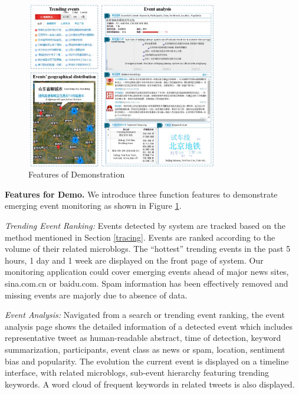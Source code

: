 \makeatletter
\setlength{\@fptop}{0pt}
\makeatother

\begin{figure}[!t]
\centering
\includegraphics[width=3.3in, height=2.85in]{UI}
\caption{Features of Demonstration}
\label{fig:UI}
\end{figure}


\noindent\textbf{Features for Demo.}
We introduce three function features to demonstrate emerging event monitoring as shown in Figure \ref{fig:UI}.

\emph{Trending Event Ranking:}
Events detected by \ring system are tracked based on the method mentioned in Section \ref{tracing}.
Events are ranked according to the volume of their related microblogs.
The ``hottest'' trending events in the past 5 hours, 1 day and 1 week are displayed on the front page of \ring system.
Our monitoring application could cover emerging events ahead of major news sites, \eg sina.com.cn or baidu.com.
Spam information has been effectively removed and missing events are majorly due to absence of data.

\emph{Event Analysis:}
Navigated from a search or trending event ranking, the event analysis page shows the detailed information of a detected event
which includes representative tweet as human-readable abstract, time of detection, keyword summarization, participants, event class as news or spam, location, sentiment bias and popularity.
The evolution the current event is displayed on a timeline interface, with related microblogs, sub-event hierarchy featuring trending keywords.
A word cloud of frequent keywords in related tweets is also displayed.

